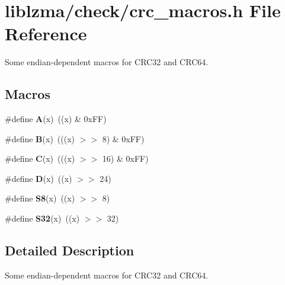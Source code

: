\section{liblzma/check/crc\+\_\+macros.h File Reference}
\label{crc__macros_8h}


Some endian-\/dependent macros for C\+R\+C32 and C\+R\+C64.  


\subsection*{Macros}
\begin{DoxyCompactItemize}
\item 
\mbox{\label{crc__macros_8h_a3d7d1b6b25e26030cf09f680a1aa0e81}} 
\#define {\bfseries A}(x)~((x) \& 0x\+F\+F)
\item 
\mbox{\label{crc__macros_8h_a7b96e3a863c6ef1b261c051574113e7c}} 
\#define {\bfseries B}(x)~(((x) $>$$>$ 8) \& 0x\+F\+F)
\item 
\mbox{\label{crc__macros_8h_ac54ae397901fe700628cafadea3c5208}} 
\#define {\bfseries C}(x)~(((x) $>$$>$ 16) \& 0x\+F\+F)
\item 
\mbox{\label{crc__macros_8h_afde8558db9d410d0f8b1930a5a369bdf}} 
\#define {\bfseries D}(x)~((x) $>$$>$ 24)
\item 
\mbox{\label{crc__macros_8h_a4d7041a2f2d398dc49293e0638261315}} 
\#define {\bfseries S8}(x)~((x) $>$$>$ 8)
\item 
\mbox{\label{crc__macros_8h_a216733d65bf68cb0eb4bcfc3188aee18}} 
\#define {\bfseries S32}(x)~((x) $>$$>$ 32)
\end{DoxyCompactItemize}


\subsection{Detailed Description}
Some endian-\/dependent macros for C\+R\+C32 and C\+R\+C64. 

